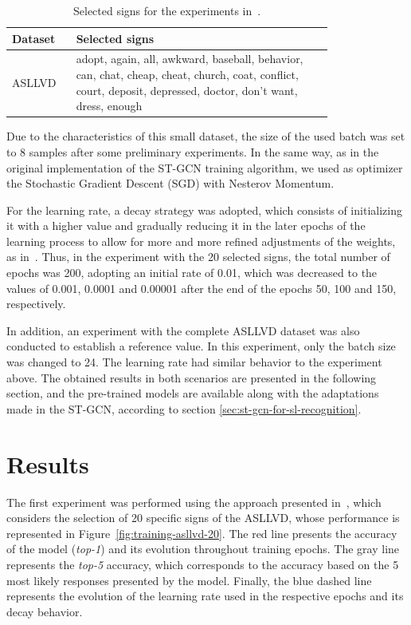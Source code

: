 \begin{table}[ht]
\centering
\caption{Selected signs for the experiments in~\cite{lim-2016}.}
\label{tab:asllvd-20}
\begin{tabular}{ l | p{0.8\linewidth} }
\hline
Dataset & Selected signs \\ \hline
ASLLVD & adopt, again, all, awkward, baseball, behavior, can, chat, cheap, cheat, church, coat, conflict, court, deposit, depressed, doctor, don’t want, dress, enough \\ \hline
\end{tabular}
\end{table}


Due to the characteristics of this small dataset, the size of the used batch was set to 8 samples after some preliminary experiments. 
In the same way, as in the original implementation of the ST-GCN training algorithm, we used as optimizer the Stochastic Gradient Descent (SGD) with Nesterov Momentum. 

For the learning rate, a decay strategy was adopted, which consists of initializing it with a higher value and gradually reducing it in the later epochs of the learning process to allow for more and more refined adjustments of the weights, as in~\cite{st-gcn-2018}. Thus, in the experiment with the 20 selected signs, the total number of epochs was 200, adopting an initial rate of 0.01, which was decreased to the values of 0.001, 0.0001 and 0.00001 after the end of the epochs 50, 100 and 150, respectively.

In addition, an experiment with the complete ASLLVD dataset was also conducted to establish a reference value. In this experiment, only the batch size was changed to 24. The learning rate had similar behavior to the experiment above. The obtained results in both scenarios are presented in the following section, and the pre-trained models are available along with the adaptations made in the ST-GCN, according to section \ref{sec:st-gcn-for-sl-recognition}. %


\section{Results} 
\label{sec:results}

The first experiment was performed using the approach presented in~\cite{lim-2016}, which considers the selection of 20 specific signs of the ASLLVD, whose performance is represented in Figure~\ref{fig:training-asllvd-20}. The red line presents the accuracy of the model (\textit{top-1}) and its evolution throughout training epochs. The gray line represents the \textit{top-5} accuracy, which corresponds to the accuracy based on the 5 most likely responses presented by the model. Finally, the blue dashed line represents the evolution of the learning rate used in the respective epochs and its decay behavior.


